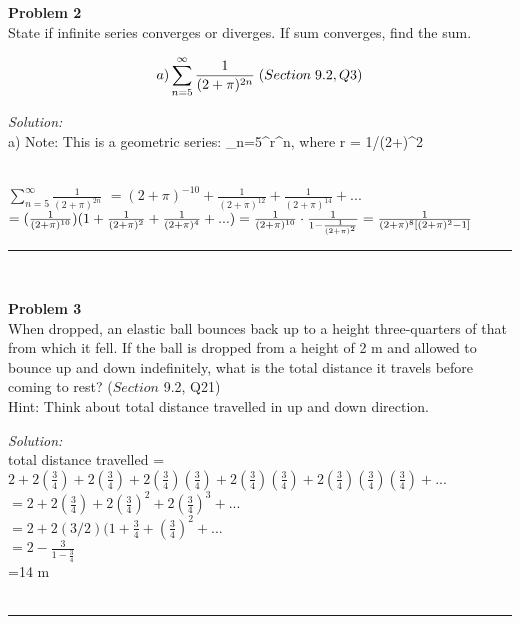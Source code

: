 \documentclass[a4paper, 11pt]{article}
\newenvironment{problem}[2][Problem]
    { \begin{mdframed}[backgroundcolor=gray!20] \textbf{#1 #2} \\}
    {  \end{mdframed}}
\newenvironment{solution}
    {\textit{Solution:}}
    {}
\begin{document}

\begin{problem}{2}
State if infinite series converges or diverges.  If sum converges, find the sum.

\begin{align*}
a)\sum\limits_{n=5}^\infty \frac{1}{(2+\pi)^{2n}}  \;\tiny (Section\; 9.2, Q3)
\end{align*}
\end{problem}
\begin{solution}
\\a) Note: This is a geometric series: \sum_{n=5}^\infty r^n, where \; r = 1/(2+\pi)^2

\\$
\sum\limits_{n=5}^\infty \frac{1}{(2+\pi)^{2n}} 
$
$
= {(2+\pi)^{-10}} + \frac{1}{(2+\pi)^{12}} + \frac{1}{(2+\pi)^{14}} + ...$\\$
= (\frac{1}{(2+\pi)^{10}}) (1 + \frac{1}{(2+\pi)^2} + \frac{1}{(2+\pi)^4} + ...)\\
=\frac{1}{(2+\pi)^{10}} \cdot \frac{1}{1-\frac{1}{(2+\pi)^2}}\\
= \frac{1}{(2+\pi)^8 [(2+\pi)^2 -1]}
$
\\
\end{solution} 
\noindent\rule{7in}{2.8pt}
\\
\begin{problem}{3}
When dropped, an elastic ball bounces back up to a height
three-quarters of that from which it fell. If the ball is dropped
from a height of 2 m and allowed to bounce up and down
indefinitely, what is the total distance it travels before coming
to rest? ($Section$ 9.2, Q21)
\\Hint: Think about total distance travelled in up and down direction.
\\
\end{problem}
\begin{solution}
\\
total distance travelled = $2 + 2(\frac{3}{4}) +  2(\frac{3}{4}) + 2(\frac{3}{4})(\frac{3}{4}) + 2(\frac{3}{4})(\frac{3}{4}) + 2(\frac{3}{4})(\frac{3}{4})(\frac{3}{4}) + ...$
\\$=2+2(\frac{3}{4}) + 2(\frac{3}{4})^2 + 2(\frac{3}{4})^3 + ...$
\\$=2+2(3/2)(1+\frac{3}{4} + (\frac{3}{4})^2+...$
\\$=2-\frac{3}{1-\frac{3}{4}}$
\\=14 m
\\
\\
\end{solution} 
\noindent\rule{7in}{2.8pt}
\\
\end{document}
